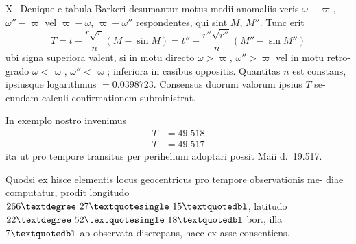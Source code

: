\documentclass[12pt,a4paper]{article}
\begin{document}
X.\ Denique e tabula Barkeri desumantur motus medii anomaliis veris
$\omega - \varpi$, $\omega'' - \varpi$ vel $\varpi - \omega$, $\varpi - \omega''$ respondentes, qui sint $M$, $M''$. Tunc erit
\[
T = t - \frac{r\sqrt{r}}{n}(M - \sin M) = t'' - \frac{r''\sqrt{r''}}{n}(M'' - \sin M'')
\]
ubi signa superiora valent, si in motu directo $\omega > \varpi$, $\omega'' > \varpi$ vel in motu retro-
grado $\omega < \varpi$, $\omega'' < \varpi$; inferiora in casibus oppositis. Quantitas $n$ est constans,
ipsiusque logarithmus $= 0.0398723$. Consensus duorum valorum ipsius $T$ se-
cundam calculi confirmationem subministrat.

In exemplo nostro invenimus
\begin{align*}
T &= 49.518 \\
T &= 49.517
\end{align*}
ita ut pro tempore transitus per perihelium adoptari possit Maii d.\ 19.517.

Quodsi ex hisce elementis locus geocentricus pro tempore observationis me-
diae computatur, prodit longitudo $266\textdegree\ 27\textquotesingle\ 15\textquotedbl$, latitudo $22\textdegree\ 52\textquotesingle\ 18\textquotedbl$ bor., illa
$7\textquotedbl$ ab observata discrepans, haec ex asse consentiens.
\end{document}
